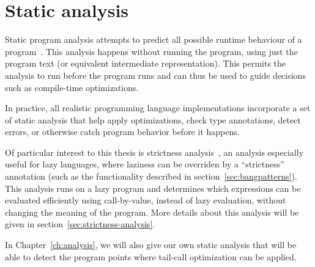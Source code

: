 \documentclass[diploma]{softlab-thesis}
\begin{document}
\section {Static analysis}
\label{sec:static-analysis}



Static program analysis attempts to predict all possible runtime
behaviour of a program~\cite{Nielson:2010:PPA:1965094}. This analysis
happens without running the program, using just the program text (or
equivalent intermediate representation). This permits the analysis to
run before the program runs and can thus be used to guide decisions
such as compile-time optimizations.

In practice, all realistic programming language implementations
incorporate a set of static analysis that help apply optimizations,
check type annotations, detect errors, or otherwise catch program
behavior before it happens.

Of particular interest to this thesis is strictness
analysis~\cite{PeytonJones:1991:UVF:645420.652528,Holdermans:2010:MSM:2088270.2088274},
an analysis especially useful for lazy languages, where laziness can
be overriden by a ``strictness'' annotation (such as the functionality
described in section~\ref{sec:bangpatterns}). This analysis runs on a
lazy program and determines which expressions can be evaluated
efficiently using call-by-value, instead of lazy evaluation, without
changing the meaning of the program. More details about this analysis will be given in section~\ref{sec:strictness-analysis}.


In Chapter~\ref{ch:analysis}, we will also give our own static
analysis that will be able to detect the program points where
tail-call optimization can be applied.


\end{document}
